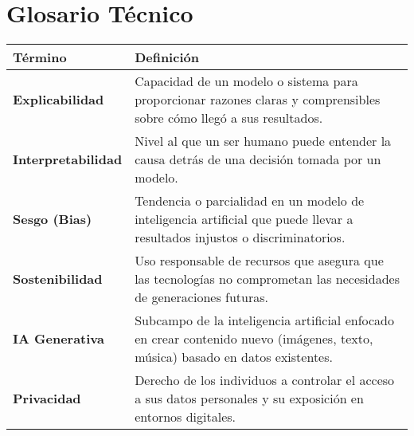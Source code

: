 \section*{Glosario Técnico}

\begin{longtable}{p{3cm}p{9cm}}
    \toprule
    \textbf{Término} & \textbf{Definición} \\
    \midrule\endhead
    \textbf{Explicabilidad} & Capacidad de un modelo o sistema para proporcionar razones claras y comprensibles sobre cómo llegó a sus resultados. \\
    \textbf{Interpretabilidad} & Nivel al que un ser humano puede entender la causa detrás de una decisión tomada por un modelo. \\
    \textbf{Sesgo (Bias)} & Tendencia o parcialidad en un modelo de inteligencia artificial que puede llevar a resultados injustos o discriminatorios. \\
    \textbf{Sostenibilidad} & Uso responsable de recursos que asegura que las tecnologías no comprometan las necesidades de generaciones futuras. \\
    \textbf{IA Generativa} & Subcampo de la inteligencia artificial enfocado en crear contenido nuevo (imágenes, texto, música) basado en datos existentes. \\
    \textbf{Privacidad} & Derecho de los individuos a controlar el acceso a sus datos personales y su exposición en entornos digitales. \\
    \bottomrule
\end{longtable}

